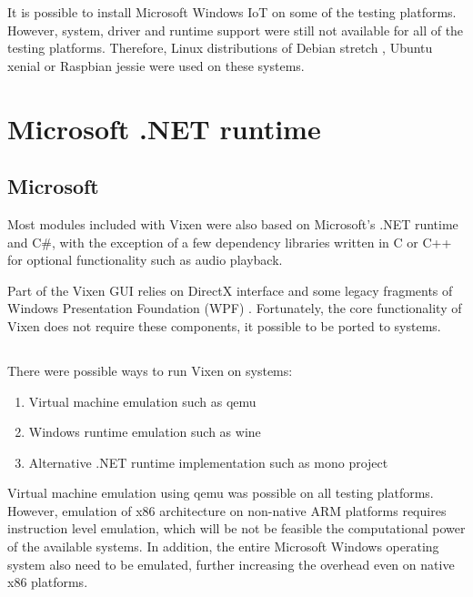 It is possible to install Microsoft Windows IoT  on some of the testing platforms. However, system, driver and runtime support were still not available for all of the testing platforms. Therefore,  \cite{debian} Linux distributions of Debian stretch \cite{debian}, Ubuntu xenial \cite{ubuntu} or Raspbian jessie \cite{raspbian} were used on these systems.

\section{Microsoft .NET runtime}

\subsection{Microsoft }

Most modules included with Vixen were also based on Microsoft's .NET runtime and C\#, with the exception of a few dependency libraries written in C \cite{kernighan1988c} or C++ \cite{stroustrup1995c++} for optional functionality such as audio playback.

Part of the Vixen GUI relies on  DirectX interface \cite{directx} and some legacy fragments of Windows Presentation Foundation (WPF) \cite{wpf}. Fortunately, the core functionality of Vixen does not require these components,  it possible to be ported to  systems.

\subsection{}

There were  possible ways to run Vixen on  systems:

\begin{enumerate}
  \item Virtual machine emulation such as qemu \cite{qemu}
  \item Windows runtime emulation such as wine \cite{wine}
  \item Alternative .NET runtime implementation such as mono project \cite{de2004mono}
\end{enumerate}

Virtual machine emulation using qemu was possible on all testing platforms. However, emulation of x86 architecture on non-native ARM platforms requires instruction level emulation, which will be not be feasible  the computational power of the available systems. In addition, the entire Microsoft Windows operating system  also need to be emulated, further increasing the overhead even on native x86 platforms.

